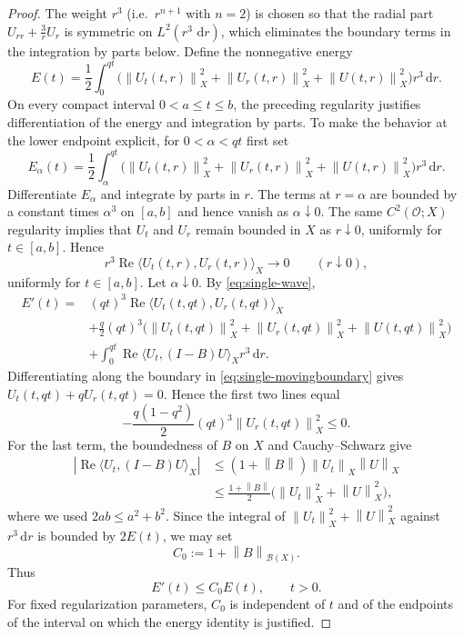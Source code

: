 \documentclass[10pt,a4paper]{amsart}
\newcommand{\dd}{\,\mathrm d}
\newcommand{\norm}[1]{\left\lVert#1\right\rVert}
\begin{document}
\begin{proof}
\medskip
The weight $r^3$ (i.e.\ $r^{n+1}$ with $n=2$) is chosen so that the radial part $U_{rr}+\tfrac3rU_r$ is  symmetric on $L^2(r^3\,\dd r)$,
which eliminates the boundary terms in the integration by parts below.
Define the nonnegative energy
\begin{equation}\label{eq:single-energy}
E(t)=\frac12\int_0^{qt}
\bigl(\norm{U_t(t,r)}_X^2+\norm{U_r(t,r)}_X^2+\norm{U(t,r)}_X^2\bigr)r^3\dd r.
\end{equation}
On every compact interval $0<a\le t\le b$, the preceding regularity justifies differentiation of the energy and integration by parts.
To make the behavior at the lower endpoint explicit, for $0<\alpha<qt$ first
set
\[
E_\alpha(t)=\frac12\int_\alpha^{qt}
\bigl(\norm{U_t(t,r)}_X^2+\norm{U_r(t,r)}_X^2+\norm{U(t,r)}_X^2\bigr)r^3\dd r.
\]
Differentiate $E_\alpha$ and integrate by parts in $r$. The terms at
$r=\alpha$ are bounded by a constant times $\alpha^3$ on $[a,b]$ and hence
vanish as $\alpha\downarrow0$.
The same $C^2(\mathcal O;X)$ regularity implies that $U_t$ and
$U_r$ remain bounded in $X$ as $r\downarrow0$, uniformly for
$t\in[a,b]$. Hence
\[
r^3\operatorname{Re}\langle U_t(t,r),U_r(t,r)\rangle_X
\longrightarrow0
\qquad(r\downarrow0),
\]
uniformly for $t\in[a,b]$. Let $\alpha\downarrow0$.
By \eqref{eq:single-wave},
\begin{align*}
E'(t)={}&(qt)^3\operatorname{Re}\langle U_t(t,qt),U_r(t,qt)\rangle_X\\
&+\frac q2(qt)^3\bigl(\norm{U_t(t,qt)}_X^2+
\norm{U_r(t,qt)}_X^2+\norm{U(t,qt)}_X^2\bigr)\\
&+\int_0^{qt}\operatorname{Re}\langle U_t,(I-B)U\rangle_Xr^3\dd r.
\end{align*}
Differentiating along the boundary in \eqref{eq:single-movingboundary} gives
$U_t(t,qt)+qU_r(t,qt)=0$.
Hence the first two lines equal
\[
-\frac{q(1-q^2)}2(qt)^3\norm{U_r(t,qt)}_X^2\le0.
\]
For the last term, the boundedness of $B$ on $X$ and Cauchy--Schwarz give
\begin{align*}
\left|\operatorname{Re}\langle U_t,(I-B)U\rangle_X\right|
&\le (1+\norm B)\norm{U_t}_X\norm U_X\\
&\le \frac{1+\norm B}{2}
   \bigl(\norm{U_t}_X^2+\norm U_X^2\bigr),
\end{align*}
where we used $2ab\leq a^2+b^2$. Since the integral of
$\norm{U_t}_X^2+\norm U_X^2$ against $r^3\dd r$ is bounded by
$2E(t)$, we may set
\[
C_0:=1+\norm{B}_{\mathcal B(X)}.
\]
Thus
\begin{equation}\label{eq:single-gronwall}
E'(t)\leq C_0 E(t),\qquad t>0.
\end{equation}
For fixed regularization parameters, $C_0$ is independent of $t$ and of the
endpoints of the interval on which the energy identity is justified.
\medskip


\end{proof}
\end{document}
